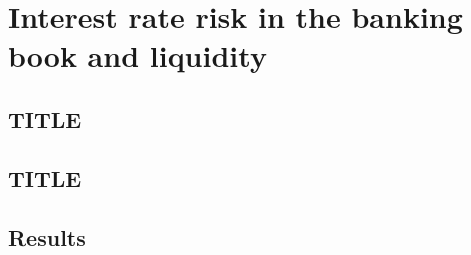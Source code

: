\chapter{Interest rate risk in the banking book and liquidity}
\label{ch:alm}


\section{TITLE}
\label{sec:m22}


\section{TITLE}
\label{sec:m23}


\section{Results}
\label{sec:results-alm}

